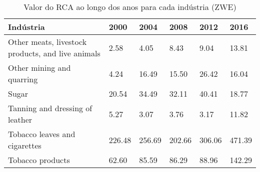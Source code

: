 \begin{table}
\centering
\caption{Valor do RCA ao longo dos anos para cada indústria (ZWE)}
\label{tab:ex3-tempo-ZWE}
\begin{tabular}{p{6cm}p{1.5cm}p{1.5cm}p{1.5cm}p{1.5cm}p{1.5cm}}
\toprule
                                        Indústria &   2000 &   2004 &   2008 &   2012 &   2016 \\
\midrule
Other meats, livestock products, and live animals &   2.58 &   4.05 &   8.43 &   9.04 &  13.81 \\
                        Other mining and quarring &   4.24 &  16.49 &  15.50 &  26.42 &  16.04 \\
                                            Sugar &  20.54 &  34.49 &  32.11 &  40.41 &  18.77 \\
                  Tanning and dressing of leather &   5.27 &   3.07 &   3.76 &   3.17 &  11.82 \\
                    Tobacco leaves and cigarettes & 226.48 & 256.69 & 202.66 & 306.06 & 471.39 \\
                                 Tobacco products &  62.60 &  85.59 &  86.29 &  88.96 & 142.29 \\
\bottomrule
\end{tabular}
\end{table}
